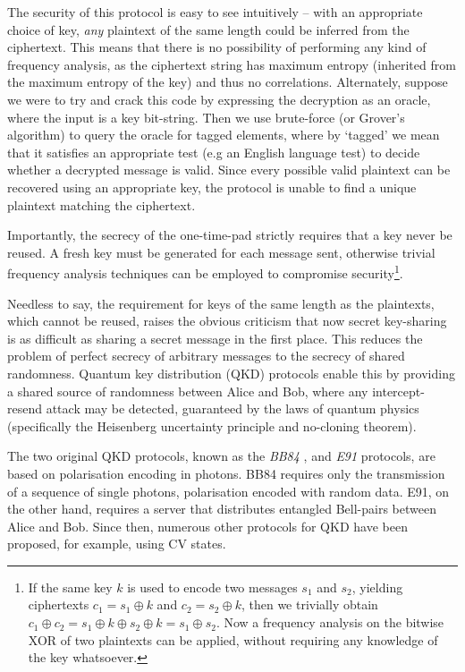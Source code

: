 \documentclass[aps, rmp, twocolumn, amsmath, amssymb, nofootinbib, superscriptaddress, longbibliography, floatfix, table-of-contents, eqsecnum]{revtex4-1}
\begin{document}
The security of this protocol is easy to see intuitively -- with an appropriate choice of key, \textit{any} plaintext of the same length could be inferred from the ciphertext. This means that there is no possibility of performing any kind of frequency analysis, as the ciphertext string has maximum entropy (inherited from the maximum entropy of the key) and thus no correlations. Alternately, suppose we were to try and crack this code by expressing the decryption as an oracle, where the input is a key bit-string. Then we use brute-force (or Grover's algorithm) to query the oracle for tagged elements, where by `tagged' we mean that it satisfies an appropriate test (e.g an English language test) to decide whether a decrypted message is valid. Since every possible valid plaintext can be recovered using an appropriate key, the protocol is unable to find a unique plaintext matching the ciphertext.

Importantly, the secrecy of the one-time-pad strictly requires that a key never be reused. A fresh key must be generated for each message sent, otherwise trivial frequency analysis techniques can be employed to compromise security\footnote{If the same key $k$ is used to encode two messages $s_1$ and $s_2$, yielding ciphertexts \mbox{$c_1=s_1\oplus k$} and \mbox{$c_2=s_2\oplus k$}, then we trivially obtain \mbox{$c_1 \oplus c_2 = s_1 \oplus k \oplus s_2 \oplus k = s_1 \oplus s_2$}. Now a frequency analysis on the bitwise XOR of two plaintexts can be applied, without requiring any knowledge of the key whatsoever.}.

Needless to say, the requirement for keys of the same length as the plaintexts, which cannot be reused, raises the obvious criticism that now secret key-sharing is as difficult as sharing a secret message in the first place. This reduces the problem of perfect secrecy of arbitrary messages to the secrecy of shared randomness. Quantum key distribution (QKD) protocols enable this by providing a shared source of randomness between Alice and Bob, where any intercept-resend attack may be detected, guaranteed by the laws of quantum physics (specifically the Heisenberg uncertainty principle and no-cloning theorem).

The two original QKD protocols, known as the \textit{BB84} \cite{bib:BennetBrassard84}, and \textit{E91} \cite{bib:Ekert91} protocols, are based on polarisation encoding in photons. BB84 requires only the transmission of a sequence of single photons, polarisation encoded with random data. E91, on the other hand, requires a server that distributes entangled Bell-pairs between Alice and Bob. Since then, numerous other protocols for QKD have been proposed, for example, using CV states.
\end{document}
